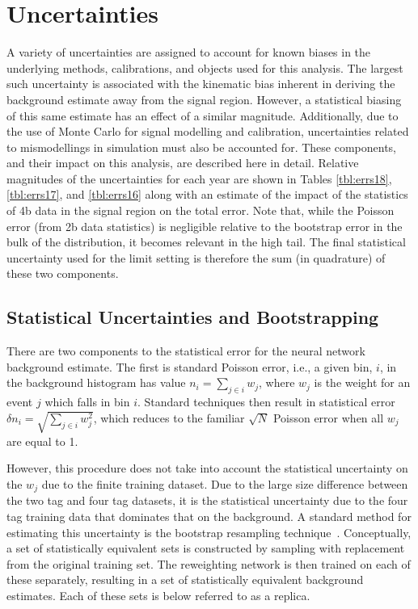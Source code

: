 \section{Uncertainties}
A variety of uncertainties are assigned to account for known biases in the
underlying methods, calibrations, and objects used for this analysis. The
largest such uncertainty is associated with the kinematic bias inherent in
deriving the background estimate away from the signal region. However, a
statistical biasing of this same estimate has an effect of a similar magnitude.
Additionally, due to the use of Monte Carlo for signal modelling and \btag
calibration, uncertainties related to mismodellings in simulation must also be
accounted for. These components, and their impact on this analysis, are
described here in detail. Relative magnitudes of the uncertainties for
each year are shown in Tables \ref{tbl:errs18}, \ref{tbl:errs17}, and
\ref{tbl:errs16} along with an estimate of the impact of the statistics of 4b
data in the signal region on the total error. Note that, while the Poisson
error (from 2b data statistics) is negligible relative to the bootstrap error 
in the bulk of the distribution, it becomes relevant in the high \mhh tail. 
The final statistical uncertainty used for the limit setting is therefore the 
sum (in quadrature) of these two components. 

%	

\subsection{Statistical Uncertainties and Bootstrapping}
There are two components to the statistical error for the neural network
background estimate. The first is standard Poisson error, i.e., a given bin,
$i$, in the background histogram has value $n_i = \sum\limits_{j\in i} w_j$,
where $w_j$ is the weight for an event $j$ which falls in bin $i$. Standard
techniques then result in statistical error $\delta n_i =
	\sqrt{\sum\limits_{j\in i} w_j^2}$, which reduces to the familiar $\sqrt{N}$
Poisson error when all $w_j$ are equal to 1.

However, this procedure does not take into account the statistical uncertainty
on the $w_j$ due to the finite training dataset. Due to the large size
difference between the two tag and four tag datasets, it is the statistical
uncertainty due to the four tag training data that dominates that on the
background. A standard method for estimating this uncertainty is the bootstrap
resampling technique~\cite{Bootstrap}. Conceptually, a set of statistically
equivalent sets is constructed by sampling with replacement from the original
training set. The reweighting network is then trained on each of these
separately, resulting in a set of statistically equivalent background estimates.
Each of these sets is below referred to as a replica.

